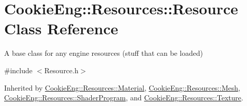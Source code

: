 \hypertarget{class_cookie_eng_1_1_resources_1_1_resource}{}\section{Cookie\+Eng\+:\+:Resources\+:\+:Resource Class Reference}
\label{class_cookie_eng_1_1_resources_1_1_resource}


A base class for any engine resources (stuff that can be loaded)  




{\ttfamily \#include $<$Resource.\+h$>$}



Inherited by \hyperlink{class_cookie_eng_1_1_resources_1_1_material}{Cookie\+Eng\+::\+Resources\+::\+Material}, \hyperlink{struct_cookie_eng_1_1_resources_1_1_mesh}{Cookie\+Eng\+::\+Resources\+::\+Mesh}, \hyperlink{class_cookie_eng_1_1_resources_1_1_shader_program}{Cookie\+Eng\+::\+Resources\+::\+Shader\+Program}, and \hyperlink{class_cookie_eng_1_1_resources_1_1_texture}{Cookie\+Eng\+::\+Resources\+::\+Texture}.

